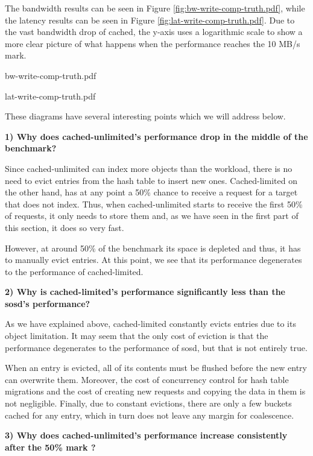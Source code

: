 The bandwidth results can be seen in Figure \ref{fig:bw-write-comp-truth.pdf}, 
while the latency results can be seen in Figure 
\ref{fig:lat-write-comp-truth.pdf}.  Due to the vast bandwidth drop of cached, 
the y-axis uses a logarithmic scale to show a more clear picture of what 
happens when the performance reaches the 10 MB/s mark.

{bw-write-comp-truth.pdf}

{lat-write-comp-truth.pdf}

These diagrams have several interesting points which we will address below.

\textbf{1) Why does cached-unlimited's performance drop in the middle of the 
	benchmark?}

Since cached-unlimited can index more objects than the workload, there is no 
need to evict entries from the hash table to insert new ones. Cached-limited on 
the other hand, has at any point a 50\% chance to receive a request for a 
target that does not index. Thus, when cached-unlimited starts to receive the 
first 50\% of requests, it only needs to store them and, as we have seen in the 
first part of this section, it does so very fast.

However, at around 50\% of the benchmark its space is depleted and thus, it has 
to manually evict entries. At this point, we see that its performance 
degenerates to the performance of cached-limited.

\textbf{2) Why is cached-limited's performance significantly less than the 
	sosd's performance?}

As we have explained above, cached-limited constantly evicts entries due to its 
object limitation. It may seem that the only cost of eviction is that the 
performance degenerates to the performance of sosd, but that is not entirely 
true.

When an entry is evicted, all of its contents must be flushed before the new 
entry can overwrite them. Moreover, the cost of concurrency control for hash 
table migrations and the cost of creating new requests and copying the data in 
them is not negligible. Finally, due to constant evictions, there are only a 
few buckets cached for any entry, which in turn does not leave any margin for 
coalescence.

\textbf{3) Why does cached-unlimited's performance increase consistently after 
	the 50\% mark ?}


